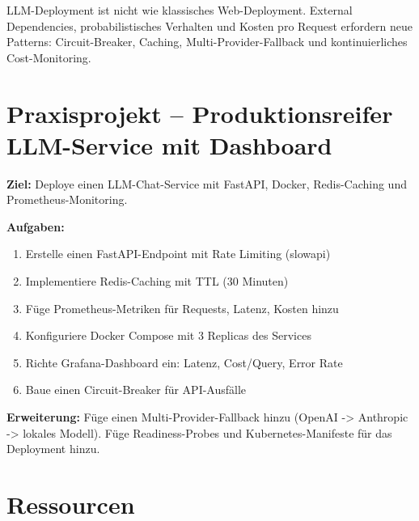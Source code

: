 \par\mbox{}\par
\begin{merkeEnv}
LLM-Deployment ist nicht wie klassisches Web-Deployment. External Dependencies, probabilistisches Verhalten und Kosten pro Request erfordern neue Patterns: Circuit-Breaker, Caching, Multi-Provider-Fallback und kontinuierliches Cost-Monitoring.
\end{merkeEnv}

\section{Praxisprojekt -- Produktionsreifer LLM-Service mit Dashboard}

\textbf{Ziel:} Deploye einen LLM-Chat-Service mit FastAPI, Docker, Redis-Caching und Prometheus-Monitoring.

\textbf{Aufgaben:}
\begin{enumerate}[leftmargin=*]
    \item Erstelle einen FastAPI-Endpoint mit Rate Limiting (slowapi)
    \item Implementiere Redis-Caching mit TTL (30 Minuten)
    \item Füge Prometheus-Metriken für Requests, Latenz, Kosten hinzu
    \item Konfiguriere Docker Compose mit 3 Replicas des Services
    \item Richte Grafana-Dashboard ein: Latenz, Cost/Query, Error Rate
    \item Baue einen Circuit-Breaker für API-Ausfälle
\end{enumerate}

\textbf{Erweiterung:} Füge einen Multi-Provider-Fallback hinzu (OpenAI -> Anthropic -> lokales Modell).
Füge Readiness-Probes und Kubernetes-Manifeste für das Deployment hinzu.

\section{Ressourcen}

